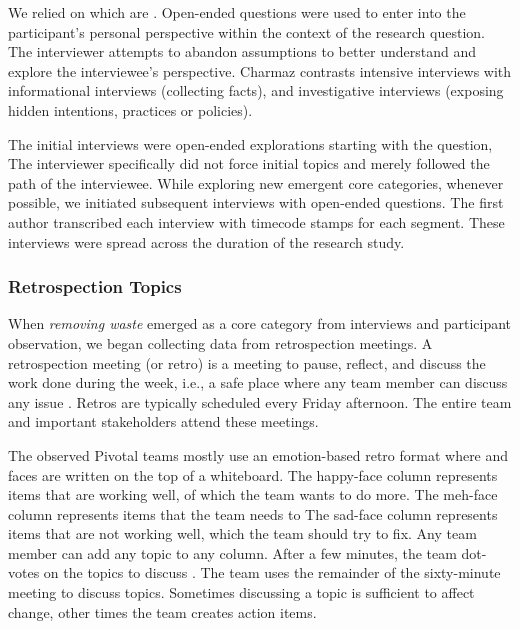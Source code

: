 We relied on  which are  \cite{Charmaz}. Open-ended questions were used to enter into the participant's personal perspective within the context of the research question. The interviewer attempts to abandon assumptions to better understand and explore the interviewee's perspective. Charmaz \cite{Charmaz} contrasts intensive interviews with informational interviews (collecting facts), and investigative interviews (exposing hidden intentions, practices or policies).

The initial interviews were open-ended explorations starting with the question,  The interviewer specifically did not force initial topics and merely followed the path of the interviewee. While exploring new emergent core categories, whenever possible, we initiated subsequent interviews with open-ended questions. The first author transcribed each interview with timecode stamps for each segment. These interviews were spread across the duration of the research study. 
\subsubsection{Retrospection Topics}
When \textit{removing waste} emerged as a core category from interviews and participant observation, we began collecting data from retrospection meetings. A retrospection meeting (or retro) is a meeting to pause, reflect, and discuss the work done during the week, i.e., a safe place where any team member can discuss any issue \cite{DerbyAgileRetrospectives}. Retros are typically scheduled every Friday afternoon. The entire team and important stakeholders attend these meetings. 

The observed Pivotal teams mostly use an emotion-based retro format where   and  faces are written on the top of a whiteboard. The happy-face column represents items that are working well, of which the team wants to do more. The meh-face column represents  items that the team needs to  The sad-face column represents items that are not working well, which the team should try to fix. Any team member can add any topic to any column. After a few minutes, the team dot-votes on the topics to discuss \cite{DerbyAgileRetrospectives}. The team uses the remainder of the sixty-minute meeting to discuss topics. Sometimes discussing a topic is sufficient to affect change, other times the team creates action items. 

